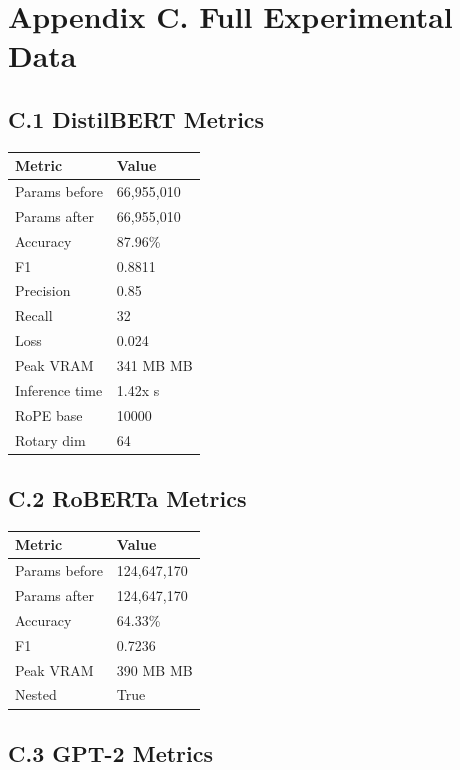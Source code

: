 
\section{Appendix C. Full Experimental Data}

\subsection{C.1 DistilBERT Metrics}

\begin{table}[H]
\centering
\small
\begin{tabular}{ll}
\toprule
\textbf{Metric} & \textbf{Value} \\
\midrule
Params before & 66,955,010 \\
Params after & 66,955,010 \\
Accuracy & 87.96\% \\
F1 & 0.8811 \\
Precision & 0.85 \\
Recall & 32 \\
Loss & 0.024 \\
Peak VRAM & 341 MB MB \\
Inference time & 1.42x s \\
RoPE base & 10000 \\
Rotary dim & 64 \\
\bottomrule
\end{tabular}
\end{table}

\subsection{C.2 RoBERTa Metrics}

\begin{table}[H]
\centering
\small
\begin{tabular}{ll}
\toprule
\textbf{Metric} & \textbf{Value} \\
\midrule
Params before & 124,647,170 \\
Params after & 124,647,170 \\
Accuracy & 64.33\% \\
F1 & 0.7236 \\
Peak VRAM & 390 MB MB \\
Nested & True \\
\bottomrule
\end{tabular}
\end{table}

\subsection{C.3 GPT-2 Metrics}

